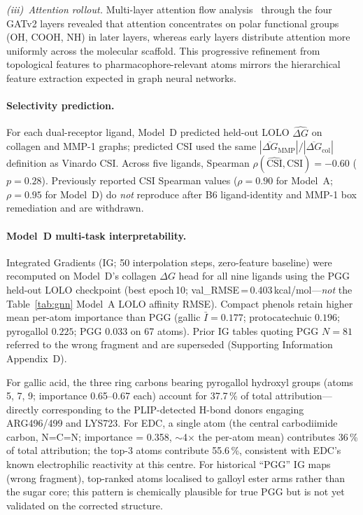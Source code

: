 \documentclass[11pt]{article}
\begin{document}
\emph{(iii)~Attention rollout.}  Multi-layer attention flow analysis~\cite{abnar2020quantifying}
through the four GATv2 layers revealed that
attention concentrates on polar functional groups (OH, COOH, NH) in
later layers, whereas early layers distribute attention more uniformly
across the molecular scaffold.  This progressive refinement from
topological features to pharmacophore-relevant atoms mirrors the
hierarchical feature extraction expected in graph neural networks.

\paragraph{Selectivity prediction.}
For each dual-receptor ligand, Model~D predicted held-out LOLO
$\hat{\Delta G}$ on collagen and MMP-1 graphs; predicted CSI used the
same $|\overline{\Delta G}_{\mathrm{MMP}}|/|\overline{\Delta G}_{\mathrm{col}}|$
definition as Vinardo CSI.
Across five ligands, Spearman $\rho(\widehat{\mathrm{CSI}},\mathrm{CSI}) = -0.60$
($p = 0.28$).
Previously reported CSI Spearman values
($\rho = 0.90$ for Model~A; $\rho = 0.95$ for Model~D)
do \emph{not} reproduce after B6 ligand-identity and MMP-1 box remediation
and are withdrawn.

\paragraph{Model~D multi-task interpretability.}
Integrated Gradients (IG; 50 interpolation steps, zero-feature baseline)
were recomputed on Model~D's collagen $\Delta G$ head for all nine ligands
using the PGG held-out LOLO checkpoint (best epoch\,10;
val\_RMSE\,=\,0.403\,kcal/mol---\emph{not} the Table~\ref{tab:gnn}
Model~A LOLO affinity RMSE).
Compact phenols retain higher mean per-atom importance than PGG
(gallic $\bar{I} = 0.177$; protocatechuic $0.196$; pyrogallol $0.225$;
PGG $0.033$ on 67 atoms).
Prior IG tables quoting PGG $N{=}81$ referred to the wrong fragment and
are superseded (Supporting Information Appendix~D).

For gallic acid, the three ring carbons bearing pyrogallol hydroxyl
groups (atoms 5, 7, 9; importance 0.65--0.67 each) account for 37.7\,\%
of total attribution---directly corresponding to the PLIP-detected
H-bond donors engaging ARG496/499 and LYS723.
For EDC, a single atom (the central carbodiimide carbon, N=C=N;
importance = 0.358, $\sim$4$\times$ the per-atom mean) contributes
36\,\% of total attribution; the top-3 atoms contribute 55.6\,\%,
consistent with EDC's known electrophilic reactivity at this centre.
For historical ``PGG'' IG maps (wrong fragment), top-ranked atoms
localised to galloyl ester arms rather than the sugar core; this pattern
is chemically plausible for true PGG but is not yet validated on the
corrected structure.
\end{document}

